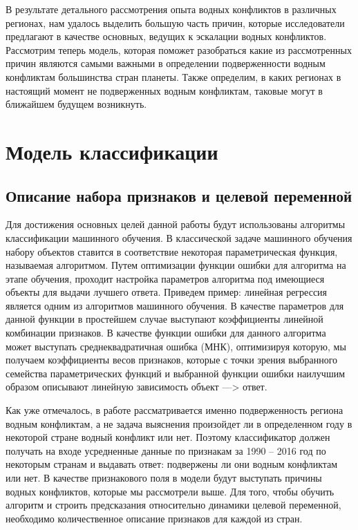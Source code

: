 \documentclass[a4paper, 12pt]{article}
\theoremstyle{plain} %
\theoremstyle{definition} %
\theoremstyle{remark} %
\begin{document}
В результате детального рассмотрения опыта водных конфликтов в различных регионах, нам удалось выделить большую часть причин, которые исследователи предлагают в качестве основных, ведущих к эскалации водных конфликтов. Рассмотрим теперь модель, которая поможет разобраться какие из рассмотренных причин являются самыми важными в определении подверженности водным конфликтам большинства стран планеты. Также определим, в каких регионах в настоящий момент не подверженных водным конфликтам, таковые могут в ближайшем будущем возникнуть.

\section{Модель классификации}
\subsection{Описание набора признаков и целевой переменной}
Для достижения основных целей данной работы будут использованы алгоритмы классификации машинного обучения. В классической задаче машинного обучения набору объектов ставится в соответствие некоторая параметрическая функция, называемая алгоритмом. Путем оптимизации функции ошибки для алгоритма на этапе обучения, проходит настройка параметров алгоритма под имеющиеся объекты для выдачи лучшего ответа. Приведем пример: линейная регрессия является одним из алгоритмов машинного обучения. В качестве параметров для данной функции в простейшем случае выступают коэффициенты линейной комбинации признаков. В качестве функции ошибки для данного алгоритма может выступать среднеквадратичная ошибка (МНК), оптимизируя которую, мы получаем коэффициенты весов признаков, которые с точки зрения выбранного семейства параметрических функций и выбранной функции ошибки наилучшим образом описывают линейную зависимость объект ---> ответ. 

Как уже отмечалось, в работе рассматривается именно подверженность региона водным конфликтам, а не задача выяснения произойдет ли в определенном году в некоторой стране водный конфликт или нет. Поэтому классификатор должен получать на входе усредненные данные по признакам за 1990 – 2016 год по некоторым странам и выдавать ответ: подвержены ли они водным конфликтам или нет. В качестве признакового поля в модели будут выступать причины водных конфликтов, которые мы рассмотрели выше. Для того, чтобы обучить алгоритм и строить предсказания относительно динамики целевой переменной, необходимо количественное описание признаков для каждой из стран.
\end{document}
